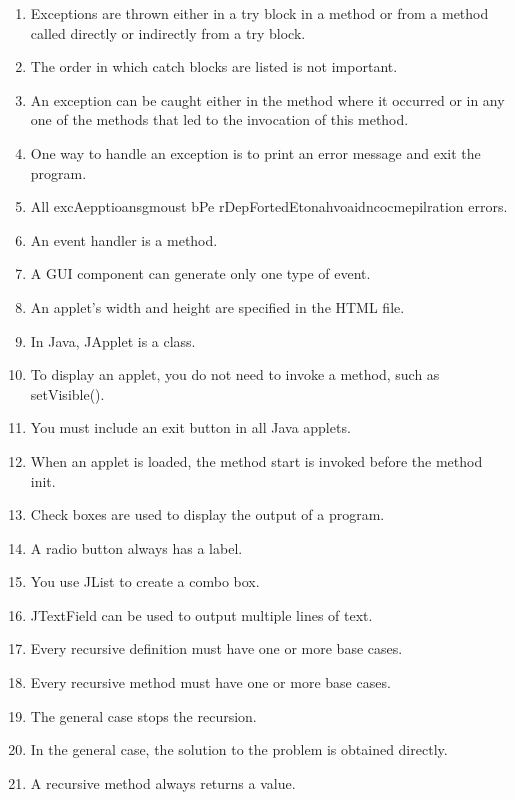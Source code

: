 \documentclass[12pt,a4paper,final,twoside,onecolumn,titlepage]{book}
\begin{document}
\begin{enumerate}
\item Exceptions are thrown either in a try block in a method or from a method called directly or indirectly from a try block.
\item The order in which catch blocks are listed is not important.
\item An exception can be caught either in the method where it occurred or in any one of the methods that led to the invocation of this method.
\item One way to handle an exception is to print an error message and exit the program.
\item All excAepptioansgmoust bPe rDepFortedEtonahvoaidncocmepilration errors.
\item An event handler is a method.
\item A GUI component can generate only one type of event.
\item An applet’s width and height are specified in the HTML file.
\item In Java, JApplet is a class.
\item To display an applet, you do not need to invoke a method, such as setVisible().
\item You must include an exit button in all Java applets.
\item When an applet is loaded, the method start is invoked before the method init.
\item Check boxes are used to display the output of a program.
\item A radio button always has a label.
\item You use JList to create a combo box.
\item JTextField can be used to output multiple lines of text.
\item Every recursive definition must have one or more base cases.
\item Every recursive method must have one or more base cases.
\item The general case stops the recursion.
\item In the general case, the solution to the problem is obtained directly.
\item A recursive method always returns a value.
\end{enumerate}
\end{document}
